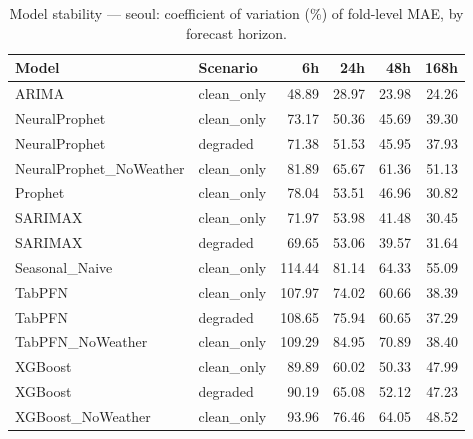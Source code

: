 \begin{table}[h]
\centering
\caption{Model stability — seoul: coefficient of variation (\%) of fold-level MAE, by forecast horizon.}
\label{tab:stability_seoul}
\begin{tabular}{llrrrr}
\toprule
Model & Scenario & 6h & 24h & 48h & 168h \\
\midrule
ARIMA & clean\_only & 48.89 & 28.97 & 23.98 & 24.26 \\
NeuralProphet & clean\_only & 73.17 & 50.36 & 45.69 & 39.30 \\
NeuralProphet & degraded & 71.38 & 51.53 & 45.95 & 37.93 \\
NeuralProphet\_NoWeather & clean\_only & 81.89 & 65.67 & 61.36 & 51.13 \\
Prophet & clean\_only & 78.04 & 53.51 & 46.96 & 30.82 \\
SARIMAX & clean\_only & 71.97 & 53.98 & 41.48 & 30.45 \\
SARIMAX & degraded & 69.65 & 53.06 & 39.57 & 31.64 \\
Seasonal\_Naive & clean\_only & 114.44 & 81.14 & 64.33 & 55.09 \\
TabPFN & clean\_only & 107.97 & 74.02 & 60.66 & 38.39 \\
TabPFN & degraded & 108.65 & 75.94 & 60.65 & 37.29 \\
TabPFN\_NoWeather & clean\_only & 109.29 & 84.95 & 70.89 & 38.40 \\
XGBoost & clean\_only & 89.89 & 60.02 & 50.33 & 47.99 \\
XGBoost & degraded & 90.19 & 65.08 & 52.12 & 47.23 \\
XGBoost\_NoWeather & clean\_only & 93.96 & 76.46 & 64.05 & 48.52 \\
\bottomrule
\end{tabular}
\end{table}
